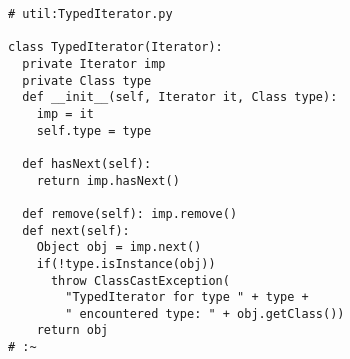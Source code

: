 \begin{lstlisting} 
# util:TypedIterator.py 

class TypedIterator(Iterator): 
  private Iterator imp 
  private Class type 
  def __init__(self, Iterator it, Class type): 
    imp = it 
    self.type = type 
    
  def hasNext(self):  
    return imp.hasNext()  
    
  def remove(self): imp.remove()  
  def next(self): 
    Object obj = imp.next() 
    if(!type.isInstance(obj)) 
      throw ClassCastException( 
        "TypedIterator for type " + type + 
        " encountered type: " + obj.getClass()) 
    return obj 
# :~ 
\end{lstlisting}
